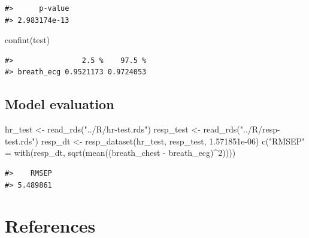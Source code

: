 \documentclass[
]{article}
\newenvironment{Shaded}{\begin{snugshade}}{\end{snugshade}}
\newcommand{\DecValTok}[1]{\textcolor[rgb]{0.00,0.00,0.81}{#1}}
\newcommand{\FloatTok}[1]{\textcolor[rgb]{0.00,0.00,0.81}{#1}}
\newcommand{\FunctionTok}[1]{\textcolor[rgb]{0.00,0.00,0.00}{#1}}
\newcommand{\NormalTok}[1]{#1}
\newcommand{\OtherTok}[1]{\textcolor[rgb]{0.56,0.35,0.01}{#1}}
\newcommand{\SpecialCharTok}[1]{\textcolor[rgb]{0.00,0.00,0.00}{#1}}
\newcommand{\StringTok}[1]{\textcolor[rgb]{0.31,0.60,0.02}{#1}}
\begin{document}
\begin{verbatim}
#>      p-value 
#> 2.983174e-13
\end{verbatim}

\begin{Shaded}
\begin{Highlighting}[]
\FunctionTok{confint}\NormalTok{(test)}
\end{Highlighting}
\end{Shaded}

\begin{verbatim}
#>                2.5 %    97.5 %
#> breath_ecg 0.9521173 0.9724053
\end{verbatim}

\hypertarget{model-evaluation}{%
\subsection{Model evaluation}\label{model-evaluation}}

\begin{Shaded}
\begin{Highlighting}[]
\NormalTok{hr\_test }\OtherTok{\textless{}{-}} \FunctionTok{read\_rds}\NormalTok{(}\StringTok{"../R/hr{-}test.rds"}\NormalTok{)}
\NormalTok{resp\_test }\OtherTok{\textless{}{-}} \FunctionTok{read\_rds}\NormalTok{(}\StringTok{"../R/resp{-}test.rds"}\NormalTok{)}
\NormalTok{resp\_dt }\OtherTok{\textless{}{-}} \FunctionTok{resp\_dataset}\NormalTok{(hr\_test, resp\_test, }\FloatTok{1.571851e{-}06}\NormalTok{)}
\FunctionTok{c}\NormalTok{(}\StringTok{"RMSEP"} \OtherTok{=} \FunctionTok{with}\NormalTok{(resp\_dt, }\FunctionTok{sqrt}\NormalTok{(}\FunctionTok{mean}\NormalTok{((breath\_chest }\SpecialCharTok{{-}}\NormalTok{ breath\_ecg)}\SpecialCharTok{\^{}}\DecValTok{2}\NormalTok{))))}
\end{Highlighting}
\end{Shaded}

\begin{verbatim}
#>    RMSEP 
#> 5.489861
\end{verbatim}

\newpage

\hypertarget{references}{%
\section*{References}\label{references}}
\end{document}
